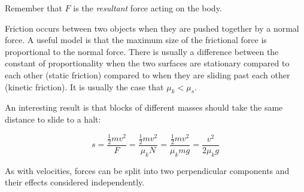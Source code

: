 \documentclass[revision-guide.tex]{subfiles}
\begin{document}

Remember that $F$ is the \emph{resultant} force acting on the body.



Friction occurs between two objects when they are pushed together by a normal force. A useful model is that the maximum size of the frictional force is proportional to the normal force. There is usually a difference between the constant of proportionality when the two surfaces are stationary compared to each other (static friction) compared to when they are sliding past each other (kinetic friction). It is usually the case that $\mu_k < \mu_s$.

An interesting result is that blocks of different masses should take the same distance to slide to a halt:

\[ s = \frac{\frac{1}{2}mv^2}{F} = \frac{\frac{1}{2}mv^2}{\mu_k N} = \frac{\frac{1}{2}mv^2}{\mu_k mg} = \frac{v^2}{2\mu_k g} \]


As with velocities, forces can be split into two perpendicular components and their effects considered independently.
\end{document}
